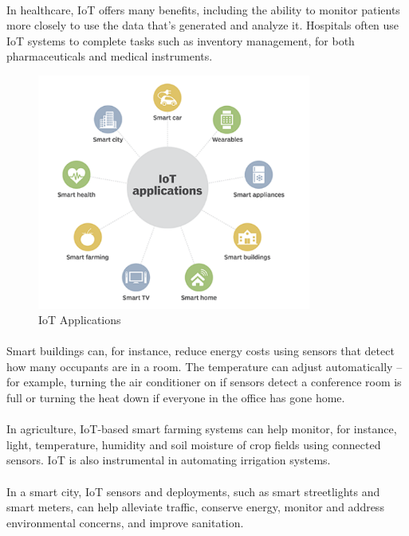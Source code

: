 \paragraph{}In healthcare, IoT offers many benefits, including the ability to monitor patients more closely to use the data that's generated and analyze it. Hospitals often use IoT systems to complete tasks such as inventory management, for both pharmaceuticals and medical instruments.
\begin{figure}[h]
	\centering
	\includegraphics[width=9cm]{./iot_application}
	\caption{IoT Applications}
\end{figure}
\paragraph{}Smart buildings can, for instance, reduce energy costs using sensors that detect how many occupants are in a room. The temperature can adjust automatically -- for example, turning the air conditioner on if sensors detect a conference room is full or turning the heat down if everyone in the office has gone home.
\paragraph{}In agriculture, IoT-based smart farming systems can help monitor, for instance, light, temperature, humidity and soil moisture of crop fields using connected sensors. IoT is also instrumental in automating irrigation systems.
\paragraph{}In a smart city, IoT sensors and deployments, such as smart streetlights and smart meters, can help alleviate traffic, conserve energy, monitor and address environmental concerns, and improve sanitation.
